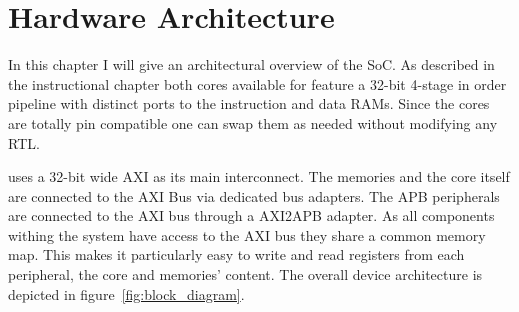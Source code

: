 
\chapter{Hardware Architecture}

In this chapter I will give an architectural overview of the \pulpino SoC. As described in the instructional chapter both cores available for \pulpino feature a 32-bit 4-stage in order pipeline with distinct ports to the instruction and data RAMs. Since the cores are totally pin compatible one can swap them as needed without modifying any RTL.

\pulpino uses a 32-bit wide AXI as its main interconnect. The memories and the core itself are connected to the AXI Bus via dedicated bus adapters. The APB peripherals are connected to the AXI bus through a AXI2APB adapter. As all components withing the system have access to the AXI bus they share a common memory map. This makes it particularly easy to write and read registers from each peripheral, the core and memories' content. The overall device architecture is depicted in figure~\ref{fig:block_diagram}.


